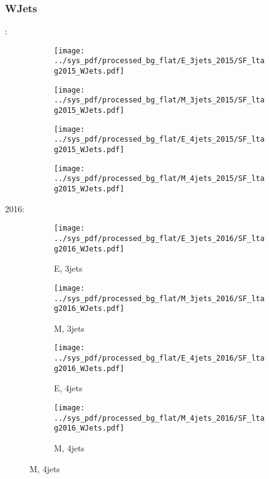 \documentclass{beamer}
\begin{document}
\begin{frame}
\frametitle{WJets}
\fontsize{5}{1}:
\begin{figure}
\centering
\begin{subfigure}[b]{0.24\textwidth}
\texttt{[image: ../sys\_pdf/processed\_bg\_flat/E\_3jets\_2015/SF\_ltag2015\_WJets.pdf]}
\end{subfigure}
\begin{subfigure}[b]{0.24\textwidth}
\texttt{[image: ../sys\_pdf/processed\_bg\_flat/M\_3jets\_2015/SF\_ltag2015\_WJets.pdf]}
\end{subfigure}
\begin{subfigure}[b]{0.24\textwidth}
\texttt{[image: ../sys\_pdf/processed\_bg\_flat/E\_4jets\_2015/SF\_ltag2015\_WJets.pdf]}
\end{subfigure}
\begin{subfigure}[b]{0.24\textwidth}
\texttt{[image: ../sys\_pdf/processed\_bg\_flat/M\_4jets\_2015/SF\_ltag2015\_WJets.pdf]}
\end{subfigure}
\end{figure}
2016:
\begin{figure}
\centering
\begin{subfigure}[b]{0.24\textwidth}
\texttt{[image: ../sys\_pdf/processed\_bg\_flat/E\_3jets\_2016/SF\_ltag2016\_WJets.pdf]}
\captionsetup{font=tiny}
\caption{E, 3jets}
\end{subfigure}
\begin{subfigure}[b]{0.24\textwidth}
\texttt{[image: ../sys\_pdf/processed\_bg\_flat/M\_3jets\_2016/SF\_ltag2016\_WJets.pdf]}
\captionsetup{font=tiny}
\caption{M, 3jets}
\end{subfigure}
\begin{subfigure}[b]{0.24\textwidth}
\texttt{[image: ../sys\_pdf/processed\_bg\_flat/E\_4jets\_2016/SF\_ltag2016\_WJets.pdf]}
\captionsetup{font=tiny}
\caption{E, 4jets}
\end{subfigure}
\begin{subfigure}[b]{0.24\textwidth}
\texttt{[image: ../sys\_pdf/processed\_bg\_flat/M\_4jets\_2016/SF\_ltag2016\_WJets.pdf]}
\captionsetup{font=tiny}
\caption{M, 4jets}
\end{subfigure}
\end{figure}
\end{frame}
\end{document}
